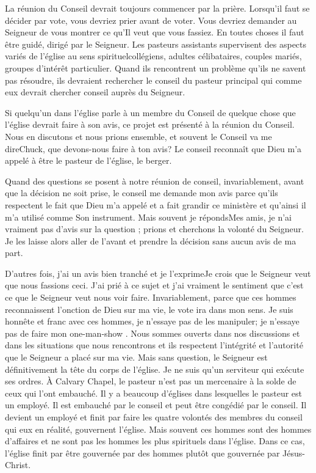 La réunion du Conseil devrait toujours commencer par la prière. Lorsqu’il faut se décider par vote, vous devriez prier
avant de voter. Vous devriez demander au Seigneur de vous montrer ce qu’Il veut que vous fassiez. En toutes choses
il faut être guidé, dirigé par le Seigneur. Les pasteurs assistants supervisent des aspects variés de l’église au sens
spirituel\frcolon collégiens, adultes célibataires, couples mariés, groupes d’intérêt particulier. Quand ils rencontrent un
problème qu’ils ne savent pas résoudre, ils devraient rechercher le conseil du pasteur principal qui comme eux devrait
chercher conseil auprès du Seigneur.

Si quelqu’un dans l’église parle à un membre du Conseil de quelque chose que l’église devrait faire à son avis, ce
projet est présenté à la réunion du Conseil. Nous en discutons et nous prions ensemble, et souvent le Conseil va me
dire\frcolon\og Chuck, que devons-nous faire à ton avis?\fg{} Le conseil reconnaît que Dieu m’a appelé à être le pasteur de
l’église, le berger.

Quand des questions se posent à notre réunion de conseil, invariablement, avant que la décision ne soit prise, le
conseil me demande mon avis parce qu’ils respectent le fait que Dieu m’a appelé et a fait grandir ce ministère et
qu'ainsi il m’a utilisé comme Son instrument. Mais souvent je réponds\frcolon\og Mes amis, je n’ai vraiment pas d’avis sur la
question ; prions et cherchons la volonté du Seigneur.\fg{} Je les laisse alors aller de l’avant et prendre la décision sans
aucun avis de ma part.

D’autres fois, j’ai un avis bien tranché et je l’exprime\frcolon\og Je crois que le Seigneur veut que nous fassions ceci. J’ai prié à
ce sujet et j’ai vraiment le sentiment que c’est ce que le Seigneur veut nous voir faire. Invariablement, parce que ces
hommes reconnaissent l’onction de Dieu sur ma vie, le vote ira dans mon sens. Je suis honnête et franc avec ces
hommes, je n’essaye pas de les manipuler; je n’essaye pas de faire mon \og one-man-show \fg{}. Nous sommes ouverts
dans nos discussions et dans les situations que nous rencontrons et ils respectent l’intégrité et l’autorité que le
Seigneur a placé sur ma vie. Mais sans question, le Seigneur est définitivement la tête du corps de l’église. Je ne suis
qu’un serviteur qui exécute ses ordres. À Calvary Chapel, le pasteur n’est pas un mercenaire à la solde de ceux qui
l'ont embauché. Il y a beaucoup d’églises dans lesquelles le pasteur est un employé. Il est embauché par le conseil et
peut être congédié par le conseil. Il devient un employé et finit par faire les quatre volontés des membres du conseil
qui eux en réalité, gouvernent l’église. Mais souvent ces hommes sont des hommes d’affaires et ne sont pas les
hommes les plus spirituels dans l’église. Dans ce cas, l’église finit par être gouvernée par des hommes plutôt que
gouvernée par Jésus-Christ.

